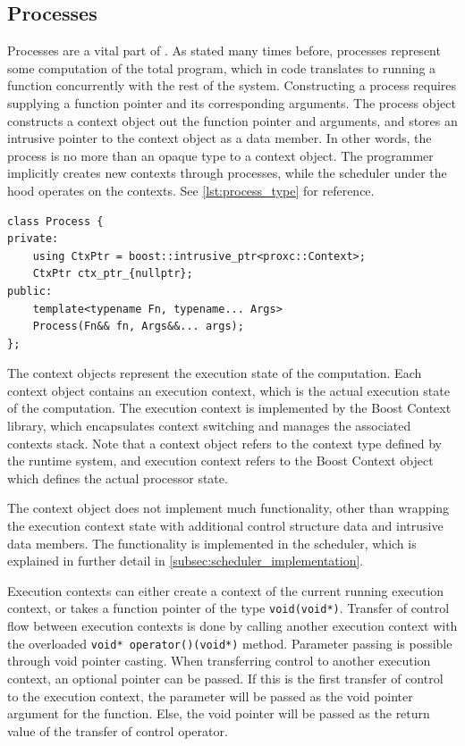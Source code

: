 \subsection{Processes}
\label{subsec:process_implementation}


Processes are a vital part of \Proxc{}. As stated many times before, processes represent some computation of the total program, which in code translates to running a function concurrently with the rest of the system. Constructing a process requires supplying a function pointer and its corresponding arguments. The process object constructs a context object out the function pointer and arguments, and stores an intrusive pointer to the context object as a data member. In other words, the process is no more than an opaque type to a context object. The programmer implicitly creates new contexts through processes, while the scheduler under the hood operates on the contexts. See \cref{lst:process_type} for reference.

\begin{lstfloat}
\begin{lstlisting}[caption={Minimal process type.}, label={lst:process_type}, style={CustomC++}, xleftmargin={2em}]
class Process {
private:
    using CtxPtr = boost::intrusive_ptr<proxc::Context>;
    CtxPtr ctx_ptr_{nullptr};
public:
    template<typename Fn, typename... Args>
    Process(Fn&& fn, Args&&... args);
};
\end{lstlisting}
\end{lstfloat}

The context objects represent the execution state of the computation. Each context object contains an execution context, which is the actual execution state of the computation. The execution context is implemented by the Boost Context library, which encapsulates context switching and manages the associated contexts stack. Note that a context object refers to the context type defined by the runtime system, and execution context refers to the Boost Context object which defines the actual processor state.

The context object does not implement much functionality, other than wrapping the execution context state with additional control structure data and intrusive data members. The functionality is implemented in the scheduler, which is explained in further detail in \cref{subsec:scheduler_implementation}.

Execution contexts can either create a context of the current running execution context, or takes a function pointer of the type \lstinline[style={CustomC++}]|void(void*)|. Transfer of control flow between execution contexts is done by calling another execution context with the overloaded \lstinline[style={CustomC++}]|void* operator()(void*)| method. Parameter passing is possible through void pointer casting. When transferring control to another execution context, an optional pointer can be passed. If this is the first transfer of control to the execution context, the parameter will be passed as the void pointer argument for the function. Else, the void pointer will be passed as the return value of the transfer of control operator.

